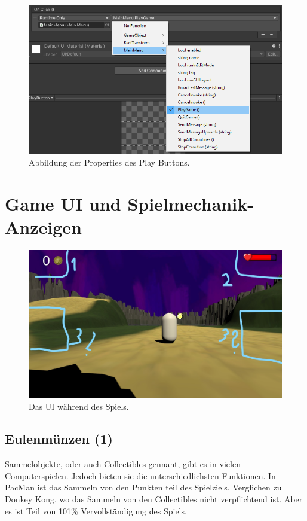 \begin{center}
    \begin{figure}[H]
        \centering
        \includegraphics[width=1\textwidth]{chapters/03/images/PlayButton.png}
            \caption{Abbildung der Properties des Play Buttons.}
            \label{htl05}
    \end{figure}
\end{center}


\section{Game UI und Spielmechanik-Anzeigen}

\begin{figure}[H]
    \centering
    \includegraphics[width=1\textwidth]{chapters/03/images/InkedGameUI.jpg}
    \caption{Das UI während des Spiels.}
    \label{htl03}
\end{figure}

\subsection{Eulenmünzen (1)}
Sammelobjekte, oder auch Collectibles gennant, gibt es in vielen Computerspielen. Jedoch bieten sie die unterschiedlichsten Funktionen. In PacMan ist das Sammeln von den Punkten teil des Spielziels. Verglichen zu Donkey Kong, wo das Sammeln von den Collectibles nicht verpflichtend ist. Aber es ist Teil von 101\% Vervollständigung des Spiels.

